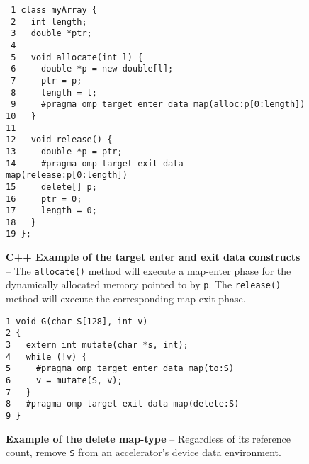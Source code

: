 

\begin{figure*}[!tb]
\begin{verbatim}
 1 class myArray {
 2   int length;
 3   double *ptr;
 4 
 5   void allocate(int l) {
 6     double *p = new double[l];
 7     ptr = p;
 8     length = l;
 9     #pragma omp target enter data map(alloc:p[0:length])
10   }
11 
12   void release() {
13     double *p = ptr;
14     #pragma omp target exit data map(release:p[0:length])
15     delete[] p;
16     ptr = 0;
17     length = 0;
18   }
19 };
\end{verbatim}
\caption{ \textbf {C++ Example of the target enter and exit data constructs} -- \small
          The \texttt{allocate()} method will execute a map-enter phase for the
          dynamically allocated memory pointed to by \texttt{p}.  The \texttt{release()}
          method will execute the corresponding map-exit phase.
         }
\label{figure:chapter6-target-enter-exit-data}
\end{figure*}


\begin{figure*}[!tb]
\begin{verbatim}
1 void G(char S[128], int v)
2 {
3   extern int mutate(char *s, int);
4   while (!v) {
5     #pragma omp target enter data map(to:S)
6     v = mutate(S, v);
7   }
8   #pragma omp target exit data map(delete:S)
9 }
\end{verbatim}
\caption{ \textbf {Example of the delete map-type} -- \small
          Regardless of its reference count, remove \texttt{S} from an     
          accelerator's device data environment.
         }
\label{figure:chapter6-delete-maptype}
\end{figure*}


